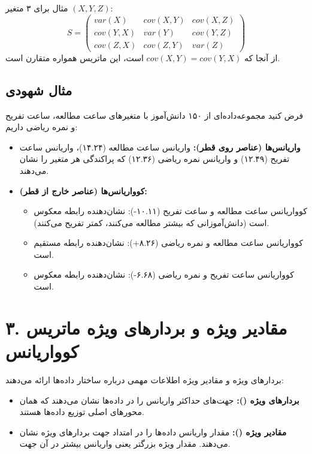 \documentclass{article}
\begin{document}
مثال برای ۳ متغیر $(X, Y, Z)$:
\[
S = \begin{pmatrix} 
var(X) & cov(X,Y) & cov(X,Z) \\ 
cov(Y,X) & var(Y) & cov(Y,Z) \\ 
cov(Z,X) & cov(Z,Y) & var(Z) 
\end{pmatrix}
\]
از آنجا که $cov(X, Y) = cov(Y, X)$ است، این ماتریس همواره متقارن است.

\subsection*{مثال شهودی}
فرض کنید مجموعه‌داده‌ای از ۱۵۰ دانش‌آموز با متغیرهای ساعت مطالعه، ساعت تفریح و نمره ریاضی داریم:
\begin{itemize}
    \item \textbf{واریانس‌ها (عناصر روی قطر):} واریانس ساعت مطالعه (۱۴.۲۴)، واریانس ساعت تفریح (۱۲.۴۹) و واریانس نمره ریاضی (۱۲.۳۶) که پراکندگی هر متغیر را نشان می‌دهند.
    \item \textbf{کوواریانس‌ها (عناصر خارج از قطر):}
    \begin{itemize}
        \item کوواریانس ساعت مطالعه و ساعت تفریح (۱۰.۱۱-): نشان‌دهنده رابطه معکوس است (دانش‌آموزانی که بیشتر مطالعه می‌کنند، کمتر تفریح می‌کنند).
        \item کوواریانس ساعت مطالعه و نمره ریاضی (۸.۲۶+): نشان‌دهنده رابطه مستقیم است.
        \item کوواریانس ساعت تفریح و نمره ریاضی (۶.۶۸-): نشان‌دهنده رابطه معکوس است.
    \end{itemize}
\end{itemize}

\section*{۳. مقادیر ویژه و بردارهای ویژه ماتریس کوواریانس}
بردارهای ویژه و مقادیر ویژه اطلاعات مهمی درباره ساختار داده‌ها ارائه می‌دهند:
\begin{itemize}
    \item \textbf{بردارهای ویژه ():} جهت‌های حداکثر واریانس را در داده‌ها نشان می‌دهند که همان محورهای اصلی توزیع داده‌ها هستند.
    \item \textbf{مقادیر ویژه ():} مقدار واریانس داده‌ها را در امتداد جهت بردارهای ویژه نشان می‌دهند. مقدار ویژه بزرگتر یعنی واریانس بیشتر در آن جهت.
\end{itemize}
\end{document}
